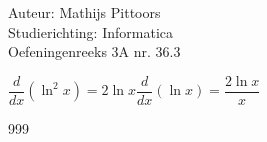 \documentclass[a4paper]{article}
\begin{document}
  
\noindent \large Auteur: Mathijs Pittoors \\
\noindent \large Studierichting: Informatica\\
\noindent \large Oefeningenreeks 3A nr. 36.3\\

\medskip

\normalsize

$\dfrac{d}{dx}\left(\ln^2x\right) = 2 \ln x \dfrac{d}{dx} (\ln x) = \dfrac{2\ln x}{x}$


\begin{thebibliography}{999}
\end{thebibliography}
\end{document}
